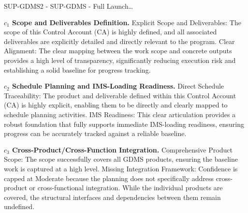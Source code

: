 \begin{frame}{SUP-GDMS2 - SUP-GDMS - Full Launch\ldots{}}
\begin{minipage}{0.90\textwidth}
\raggedright
\fontsize{8}{9.5}\selectfont
\textbf{\(c_1\) Scope and Deliverables Definition.}
Explicit Scope and Deliverables: The scope of this Control Account (CA) is highly defined, and all associated deliverables are explicitly detailed and directly relevant to the program. Clear Alignment: The clear mapping between the work scope and concrete outputs provides a high level of transparency, significantly reducing execution risk and establishing a solid baseline for progress tracking.\par\vspace{0.6em}
\textbf{\(c_2\) Schedule Planning and IMS-Loading Readiness.}
Direct Schedule Traceability: The product and deliverable defined within this Control Account (CA) is highly explicit, enabling them to be directly and clearly mapped to schedule planning activities. IMS Readiness: This clear articulation provides a robust foundation that fully supports immediate IMS-loading readiness, ensuring progress can be accurately tracked against a reliable baseline.\par\vspace{0.6em}
\textbf{\(c_3\) Cross-Product/Cross-Function Integration.}
Comprehensive Product Scope: The scope successfully covers all GDMS products, ensuring the baseline work is captured at a high level. Missing Integration Framework: Confidence is capped at Moderate because the planning does not specifically address cross-product or cross-functional integration. While the individual products are covered, the structural interfaces and dependencies between them remain undefined.\par\vspace{0.6em}
\end{minipage}
\end{frame}

\endinput
